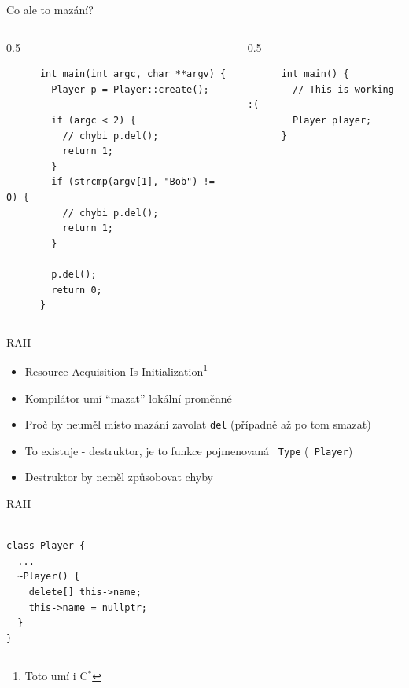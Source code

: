 \documentclass[aspectratio=1610]{beamer}
\begin{document}
\begin{frame}[fragile]{Co ale to mazání?}

\begin{columns}

  \begin{column}{0.5\textwidth}

    \begin{verbatim}
      int main(int argc, char **argv) {
        Player p = Player::create();

        if (argc < 2) {
          // chybi p.del();
          return 1;
        }
        if (strcmp(argv[1], "Bob") != 0) {
          // chybi p.del();
          return 1;
        }

        p.del();
        return 0;
      }
    \end{verbatim}
  \end{column}

  \pause

  \begin{column}{0.5\textwidth}

    \begin{verbatim}
      int main() {
        // This is working :(
        Player player;
      }
    \end{verbatim}
  \end{column}

\end{columns}

\end{frame}

\begin{frame}{RAII}

\begin{itemize}
  \item Resource Acquisition Is Initialization\footnote{Toto umí i C$^*$\cite{youtube:destructor_c}}\cite{cppreference:raii}
  \item Kompilátor umí \enquote{mazat} lokální proměnné
  \item Proč by neuměl místo mazání zavolat \texttt{del} (případně až po tom smazat)
  \item To existuje - destruktor, je to funkce pojmenovaná \texttt{~Type} (\texttt{~Player})
  \item Destruktor by neměl způsobovat chyby
\end{itemize}

\end{frame}

\begin{frame}[fragile]{RAII}

\begin{verbatim}

class Player {
  ...
  ~Player() {
    delete[] this->name;
    this->name = nullptr;
  }
}

\end{verbatim}

\end{frame}
\end{document}
